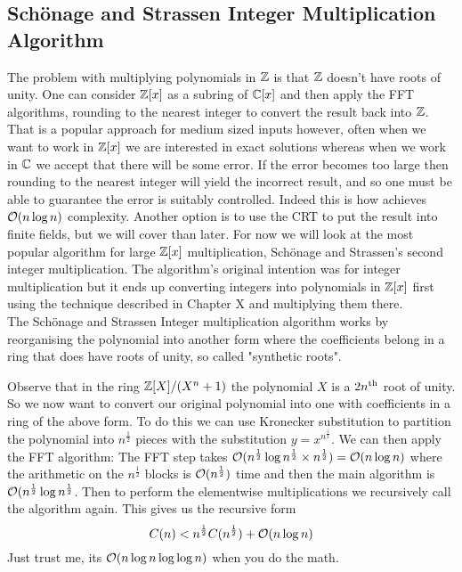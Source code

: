 \subsection{Sch\"{o}nage and Strassen Integer Multiplication Algorithm}
\label{subsec:schon-strass}

The problem with multiplying polynomials in ${\mathbb Z}$ is that ${\mathbb Z}$ doesn't have roots of unity. One can consider ${\mathbb Z}[x]$ as a subring of $\mathbb{C}[x]$ and then apply the FFT algorithms, rounding to the nearest integer to convert the result back into ${\mathbb Z}$. That is a popular approach for medium sized inputs however, often when we want to work in ${\mathbb Z}[x]$ we are interested in exact solutions whereas when we work in $\mathbb{C}$ we accept that there will be some error. If the error becomes too large then rounding to the nearest integer will yield the incorrect result, and so one must be able to guarantee the error is suitably controlled. Indeed this is how \cite{nlogn} achieves $\mathcal O(n\log n)$ complexity. Another option is to use the CRT to put the result into finite fields, but we will cover than later. For now we will look at the most popular algorithm for large ${\mathbb Z}[x]$ multiplication, Sch\"{o}nage and Strassen's second integer multiplication. The algorithm's original intention was for integer multiplication but it ends up converting integers into polynomials in ${\mathbb Z}[x]$ first using the technique described in Chapter X and multiplying them there.\\

The Sch\"{o}nage and Strassen Integer multiplication algorithm works by reorganising the polynomial into another form where the coefficients belong in a ring that does have roots of unity, so called "synthetic roots".

Observe that in the ring ${\mathbb Z}[X] / (X^n + 1)$ the polynomial $X$ is a $2n^{\textrm{th}}$ root of unity. So we now want to convert our original polynomial into one with coefficients in a ring of the above form. To do this we can use Kronecker substitution to partition the polynomial into $n^{\frac{1}{2}}$ pieces with the substitution $y = x^{n^{\frac{1}{2}}}$. We can then apply the FFT algorithm: The FFT step takes $\mathcal O(n^{\frac{1}{2}}\log n^{\frac{1}{2}} \times n^{\frac{1}{2}}) = \mathcal O(n \log n)$ where the arithmetic on the $n^{\frac{1}{2}}$ blocks is $\mathcal O(n^{\frac{1}{2}})$ time and then the main algorithm is $\mathcal O(n^{\frac{1}{2}}\log n^{\frac{1}{2}}$. Then to perform the elementwise multiplications we recursively call the algorithm again. This gives us the recursive form
\[
    C(n) < n^{\frac{1}{2}}C(n^{\frac{1}{2}}) + \mathcal O(n \log n)
\]
Just trust me, its $\mathcal O(n \log n \log \log n)$ when you do the math.


